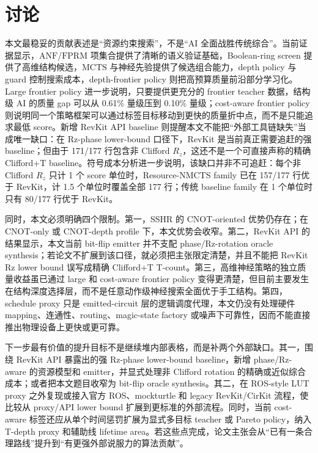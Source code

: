 \documentclass[UTF8,fontset=macnew,11pt]{ctexart}
\newcommand{\screen}{Boolean-ring screen}
\newcommand{\anf}{\ensuremath{\mathrm{ANF}}}
\newcommand{\fprm}{\ensuremath{\mathrm{FPRM}}}
\newcommand{\mcts}{\ensuremath{\mathrm{MCTS}}}
\begin{document}
\section{讨论}

本文最稳妥的贡献表述是“资源约束搜索”，不是“AI 全面战胜传统综合”。当前证据显示，\anf{}/\fprm{} 项集合提供了清晰的语义验证基础，\screen{} 提供了高维结构候选，\mcts{} 与神经先验提供了候选组合能力，depth policy 与 guard 控制搜索成本，depth-frontier policy 则把高预算质量前沿部分学习化。Large frontier policy 进一步说明，只要提供更充分的 frontier teacher 数据，结构级 AI 的质量 gap 可以从 0.61\% 量级压到 0.10\% 量级；cost-aware frontier policy 则说明同一个策略框架可以通过标签目标移动到更快的质量折中点，而不是只能追求最低 score。新增 RevKit API baseline 则提醒本文不能把“外部工具链缺失”当成唯一缺口：在 Rz-phase lower-bound 口径下，RevKit 是当前真正需要追赶的强 baseline；但由于 171/177 行包含非 Clifford $R_z$，这还不是一个可直接声称的精确 Clifford+T baseline。符号成本分析进一步说明，该缺口并非不可追赶：每个非 Clifford $R_z$ 只计 1 个 score 单位时，Resource-NMCTS family 已在 157/177 行优于 RevKit，计 1.5 个单位时覆盖全部 177 行；传统 baseline family 在 1 个单位时只有 80/177 行优于 RevKit。

同时，本文必须明确四个限制。第一，SSHR 的 CNOT-oriented 优势仍存在；在 CNOT-only 或 CNOT-depth profile 下，本文优势会收窄。第二，RevKit API 的结果显示，本文当前 bit-flip emitter 并不支配 phase/Rz-rotation oracle synthesis；若论文不扩展到该口径，就必须把主张限定清楚，并且不能把 RevKit Rz lower bound 误写成精确 Clifford+T T-count。第三，高维神经策略的独立质量收益虽已通过 large 和 cost-aware frontier policy 变得更清楚，但目前主要发生在结构深度选择层，而不是任意动作级神经搜索全面优于手工结构。第四，schedule proxy 只是 emitted-circuit 层的逻辑调度代理，本文仍没有处理硬件 mapping、连通性、routing、magic-state factory 或噪声下可靠性，因而不能直接推出物理设备上更快或更可靠。

下一步最有价值的提升目标不是继续堆内部表格，而是补两个外部缺口。其一，围绕 RevKit API 暴露出的强 Rz-phase lower-bound baseline，新增 phase/Rz-aware 的资源模型和 emitter，并显式处理非 Clifford rotation 的精确或近似综合成本；或者把本文题目收窄为 bit-flip oracle synthesis。其二，在 ROS-style LUT proxy 之外复现或接入官方 ROS、mockturtle 和 legacy RevKit/CirKit 流程，使比较从 proxy/API lower bound 扩展到更标准的外部流程。同时，当前 cost-aware 标签还应从单个时间惩罚扩展为显式多目标 teacher 或 Pareto policy，纳入 T-depth proxy 和辅助线 lifetime area。若这些点完成，论文主张会从“已有一条合理路线”提升到“有更强外部说服力的算法贡献”。
\end{document}
